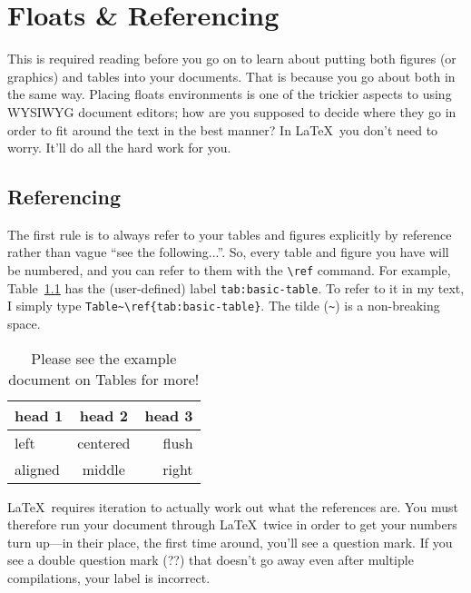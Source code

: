 \documentclass[12pt,article]{memoir}
\begin{document}
\chapter{Floats \& Referencing}

This is required reading before you go on to learn about putting both figures (or graphics) and tables into your documents. That is because you go about both in the same way. Placing floats environments is one of the trickier aspects to using WYSIWYG document editors; how are you supposed to decide where they go in order to fit around the text in the best manner? In \LaTeX\, you don't need to worry. It'll do all the hard work for you.

\section{Referencing}

The first rule is to always refer to your tables and figures explicitly by reference rather than vague ``see the following...''. So, every table and figure you have will be numbered, and you can refer to them with the \verb|\ref| command. For example, Table~\ref{tab:basic-table} has the (user-defined) label \texttt{tab:basic-table}. To refer to it in my text, I simply type \verb|Table~\ref{tab:basic-table}|\footnotemark. The tilde (\verb|~|) is a non-breaking space. 


\begin{table}[htbp]
  \centering
  \begin{tabular}{lcr} %
    \toprule
    head 1 & head 2 & head 3\\
    \midrule
    left & centered & flush \\
    aligned & middle & right \\
    \bottomrule
  \end{tabular}
  \caption{Please see the example document on Tables for more!}
  \label{tab:basic-table}
\end{table}

\LaTeX\ requires iteration to actually work out what the references are. You must therefore run your document through \LaTeX\ twice in order to get your numbers turn up---in their place, the first time around, you'll see a question mark. If you see a double question mark (??) that doesn't go away even after multiple compilations, your label is incorrect.
\end{document}
